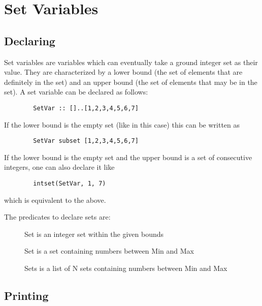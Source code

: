 \section{Set Variables}

\subsection{Declaring}
Set variables are variables which can eventually take a ground integer
set as their value.  They are characterized by a lower bound (the set
of elements that are definitely in the set) and an upper bound (the
set of elements that may be in the set).  A set variable can be
declared as follows: 
\begin{verbatim}
        SetVar :: []..[1,2,3,4,5,6,7]
\end{verbatim}
If the lower bound is the empty set (like in this case) this can be written as 
\begin{verbatim}
        SetVar subset [1,2,3,4,5,6,7]
\end{verbatim}
If the lower bound is the empty set and the upper bound is a set of
consecutive integers, one can also declare it like
\begin{verbatim}
        intset(SetVar, 1, 7)
\end{verbatim}
which is equivalent to the above.    

The predicates to declare sets are:
\begin{description}
\item[]
         Set is an integer set within the given bounds 
\item[]
         Set is a set containing numbers between Min and Max 
\item[]
         Sets is a list of N sets containing numbers between Min and Max 
\end{description}



\subsection{Printing}

